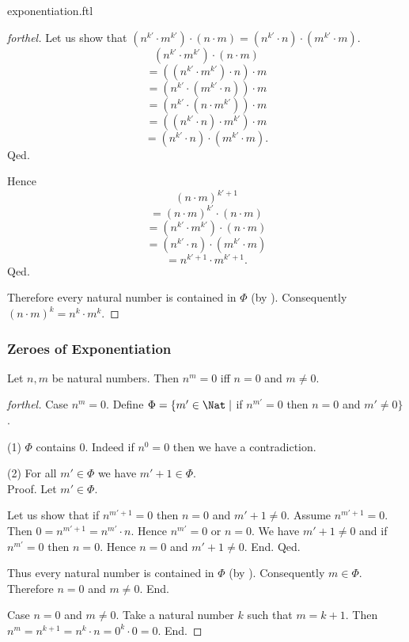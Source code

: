 \documentclass{naproche-library}
\begin{document}
\begin{smodule}{exponentiation.ftl}
\begin{proof}[forthel]
      Let us show that $(n^{k'} \cdot m^{k'}) \cdot (n \cdot m) = (n^{k'} \cdot n) \cdot (m^{k'} \cdot m)$.
        \[  (n^{k'} \cdot m^{k'}) \cdot (n \cdot m)       \]
        \[    = ((n^{k'} \cdot m^{k'}) \cdot n) \cdot m   \]
        \[    = (n^{k'} \cdot (m^{k'} \cdot n)) \cdot m   \]
        \[    = (n^{k'} \cdot (n \cdot m^{k'})) \cdot m   \]
        \[    = ((n^{k'} \cdot n) \cdot m^{k'}) \cdot m   \]
        \[    = (n^{k'} \cdot n) \cdot (m^{k'} \cdot m).  \]
      Qed.

      Hence
      \[  (n \cdot m)^{k' + 1}                          \]
      \[    = (n \cdot m)^{k'} \cdot (n \cdot m)        \]
      \[    = (n^{k'} \cdot m^{k'}) \cdot (n \cdot m)   \]
      \[    = (n^{k'} \cdot n) \cdot (m^{k'} \cdot m)   \]
      \[    = n^{k' + 1} \cdot m^{k' + 1}.              \]
    Qed.

    Therefore every natural number is contained in $\Phi$ (by ).
    Consequently $(n \cdot m)^{k} = n^{k} \cdot m^{k}$.
  \end{proof}


  \subsubsection*{Zeroes of Exponentiation}

  \begin{proposition}[forthel,id=ARITHMETIC_09_3860221447372800]
    Let $n, m$ be natural numbers.
    Then $n^{m} = 0$ iff $n = 0$ and $m \neq 0$.
  \end{proposition}
  \begin{proof}[forthel]
    Case $n^{m} = 0$.
      Define $\Phi = \{ m' \in \Nat \mid$ if $n^{m'} = 0$ then $n = 0$ and $m' \neq 0 \}$.

      (1) $\Phi$ contains $0$.
      Indeed if $n^{0} = 0$ then we have a contradiction.

      (2) For all $m' \in \Phi$ we have $m' + 1 \in \Phi$. \\
      Proof.
        Let $m' \in \Phi$.

        Let us show that if $n^{m' + 1} = 0$ then $n = 0$ and $m' + 1 \neq 0$.
          Assume $n^{m' + 1} = 0$.
          Then $0 = n^{m' + 1} = n^{m'} \cdot n$.
          Hence $n^{m'} = 0$ or $n = 0$.
          We have $m' + 1 \neq 0$ and if $n^{m'} = 0$ then $n = 0$.
          Hence $n = 0$ and $m' + 1 \neq 0$.
        End.
      Qed.

      Thus every natural number is contained in $\Phi$ (by ).
      Consequently $m \in \Phi$.
      Therefore $n = 0$ and $m \neq 0$.
    End.

    Case $n = 0$ and $m \neq 0$.
      Take a natural number $k$ such that $m = k + 1$.
      Then $n^{m}
        = n^{k + 1}
        = n^{k} \cdot n
        = 0^{k} \cdot 0
        = 0$.
    End.
  \end{proof}
\end{smodule}
\end{document}
